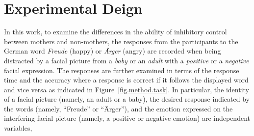 \section{Experimental Deign}\label{sec.hypothesis.design}
\begin{table}[!t]
\centering
\caption{Experiment conditions for the group of mother ($m1\cdots m8$,)  and non-mother ($n1\cdots n8$ ), indicating the number for the 8 different conditions in each group.}
\label{tab.hypothesis.whole.design}
\end{table}
In this work,
to examine the differences in the ability of inhibitory control between mothers and non-mothers, 
the responses from the participants to the German word \textit{Freude} (happy) or \textit{Ärger} (angry)
are recorded
when being distracted by a facial picture from 
a \textit{baby} or an \textit{adult} with a \textit{positive} or a \textit{negative} facial expression.
The responses are further examined in terms of the response time 
and the accuracy where a response is correct if it follows the displayed word and vice versa as indicated in Figure~\ref{fig.method.task}.
In particular,
the identity of a facial picture (namely, an adult or a baby),
the desired response indicated by the words (namely, ``Freude'' or ``Ärger''),
and the emotion expressed on the interfering facial picture (namely, a positive or negative emotion) are independent variables,
